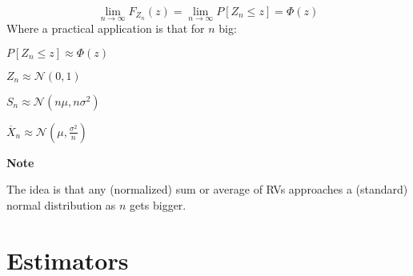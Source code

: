 \documentclass[8pt,a4paper]{extarticle}     %
\newcommand{\colfill}{\vfill\eject\columnbreak}
\newcommand{\limcont}[3]{\lim\limits_{#1 \rightarrow #2}{#3}}
\begin{document}
\begin{multicols}{4}
\begin{boxtheorem}
\[		\limcont{n}{\infty}F_{Z_n}(z) = \limcont{n}{\infty}P\left[Z_n \leq  z\right] = \Phi(z)
	\]
	Where a practical application is that for $n$ big:
	\begin{listnr}
		\item $P\left[Z_n\leq z\right]\approx \Phi(z)$
		\item $Z_n \approx \mathcal{N}(0,1)$
		\item $S_n \approx \mathcal{N}\left(n\mu, n\sigma^2\right)$ 
		\item $\overline{X}_n \approx \mathcal{N}\left(\mu, \frac{\sigma^2}{n}\right)$ 
	\end{listnr} 
\end{boxtheorem}
\begin{listb}
	\item [] \textbf{Note}
	\item The idea is that any (normalized) sum or average of RVs approaches a (standard) normal distribution as $n$ gets bigger. 
\end{listb}

\colfill 

\section{Estimators}

\end{multicols}
\end{document}
